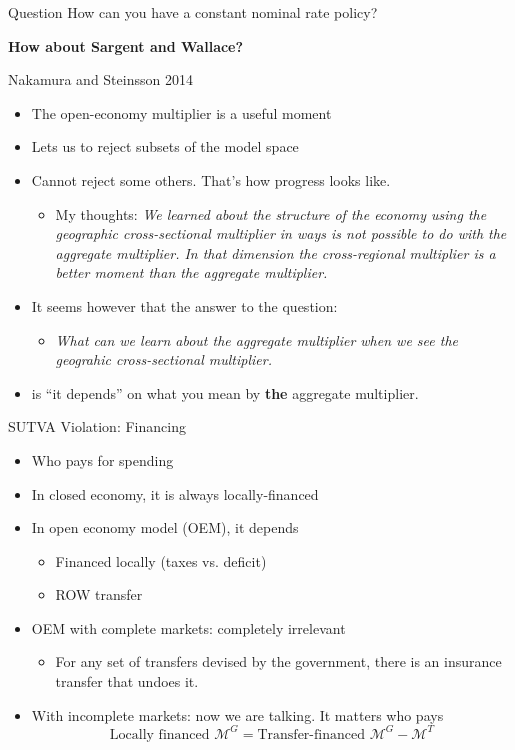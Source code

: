 \documentclass[english,xcolor=svgnames]{beamer}
\begin{document}
\begin{frame}{Question}
How can you have a constant nominal rate policy?
\begin{center} \textbf{How about Sargent and Wallace?}\end{center}
\end{frame}

\begin{frame}{Nakamura and Steinsson 2014}
\begin{itemize}
\item The open-economy multiplier is a useful moment
\item Lets us to reject subsets of the model space
\item Cannot reject some others. That's how progress looks like.
\begin{itemize}
\item My thoughts: \textit{We learned about the structure of the economy using the geographic cross-sectional multiplier in ways is not possible to do with the aggregate multiplier. In that dimension the cross-regional multiplier is a better moment than the aggregate multiplier.}
\end{itemize}
\item It seems however that the answer to the question:
\begin{itemize}
\item \textit{What can we learn about the aggregate multiplier when we see the geograhic cross-sectional multiplier.}
\end{itemize}
\item is ``it depends'' on what you mean by \textbf{the} aggregate multiplier.
\end{itemize}
\end{frame}

\begin{frame}{SUTVA Violation: Financing}
\begin{itemize}
\item Who pays for spending
\item In closed economy, it is always locally-financed
\item In open economy model (OEM), it depends
\begin{itemize}
\item Financed locally (taxes vs. deficit)
\item ROW transfer
\end{itemize}
\item OEM with complete markets: completely irrelevant
\begin{itemize}
\item For any set of transfers devised by the government, there is an insurance transfer that undoes it.
\end{itemize}
\item With incomplete markets: now we are talking. It matters who pays
$$ \text{Locally financed } \mathcal{M}^G = \text{Transfer-financed } \mathcal{M}^G -\mathcal{M}^T$$
\end{itemize}
\end{frame}
\end{document}
